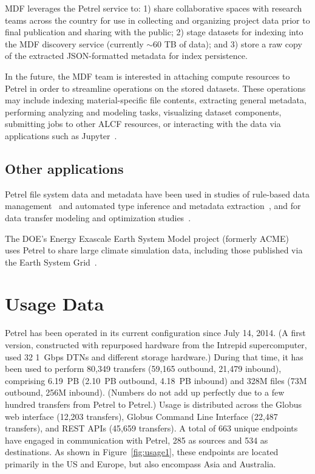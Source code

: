 \documentclass[sigconf]{acmart}
\newcommand\kyle[1]{}
\newcommand\kyle[1]{{\color{red}[Kyle: #1]}}
\begin{document}
MDF leverages the Petrel service to: 
1) share collaborative spaces with research teams across the country for use in collecting and organizing project 
data prior to final publication and sharing with the public;
2) stage datasets for indexing into the MDF discovery service (currently $\sim$60 TB of data); and
3) store a raw copy of the extracted JSON-formatted metadata for index persistence. 

In the future, the
MDF team is interested in attaching compute resources to Petrel in order to streamline operations on  
the stored datasets. 
These operations may include indexing material-specific file contents, extracting general metadata, performing analyzing and modeling tasks, visualizing dataset components, submitting jobs to other
ALCF resources, or interacting with the data via applications such as Jupyter~\cite{kluyver2016jupyter}.

\subsection{Other applications}

Petrel file system data and metadata have been used in studies of rule-based data management~\cite{chard2017ripple} and 
automated type inference and metadata extraction~\cite{beckman2017skluma},
and for data transfer modeling and optimization studies~\cite{liu2017explaining}. 

The DOE's Energy Exascale Earth System Model project (formerly ACME)~\cite{schmidt2017practice}
uses Petrel to share large climate simulation data, including those published via the Earth System Grid~\cite{doi:10.1175/2008BAMS2459.1}.

\kyle{It might not be so interesting, but we also use it for Globus labs.}

\section{Usage Data}\label{sec:usage}

Petrel has been operated in its current configuration since July 14, 2014.
(A first version, constructed with repurposed hardware from the Intrepid supercomputer,
used 32 1~Gbps DTNs and different storage hardware.)
During that time, it has been used to perform 
80,349 transfers (59,165 outbound, 21,479 inbound),
comprising 6.19~PB (2.10~PB outbound, 4.18~PB inbound) and 328M files (73M outbound, 256M inbound).
(Numbers do not add up perfectly due to a few hundred transfers from Petrel to Petrel.)
Usage is distributed across the Globus web interface (12,203 transfers), Globus Command
Line Interface (22,487 transfers), and REST APIs (45,659 transfers).
A total of 663 unique endpoints have engaged in communication with Petrel, 285 as sources and 534 as destinations. 
As shown in Figure~\ref{fig:usage1}, these endpoints are located primarily in the US and Europe, but also
encompass Asia and Australia. 
\end{document}
